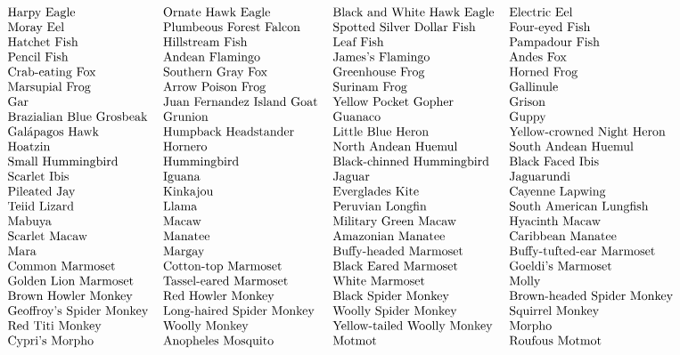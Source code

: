 \[\begin{tabular}{llll}
Harpy Eagle   & Ornate Hawk Eagle  & Black and White Hawk Eagle   & Electric Eel  \\
Moray Eel  & Plumbeous Forest Falcon   & Spotted Silver Dollar Fish   & Four-eyed Fish \\
Hatchet Fish   & Hillstream Fish   & Leaf Fish  & Pampadour Fish  \\
Pencil Fish   & Andean Flamingo  & James's Flamingo   & Andes Fox  \\
Crab-eating Fox  & Southern Gray Fox   & Greenhouse Frog   & Horned Frog \\
Marsupial Frog   & Arrow Poison Frog   & Surinam Frog  & Gallinule  \\
Gar   & Juan Fernandez Island Goat  & Yellow Pocket Gopher   & Grison  \\
Brazialian Blue Grosbeak  & Grunion   & Guanaco   & Guppy \\
Gal\'{a}pagos Hawk   & Humpback Headstander   & Little Blue Heron  & Yellow-crowned Night Heron  \\
Hoatzin   & Hornero  & North Andean Huemul   & South Andean Huemul  \\
Small Hummingbird  & Hummingbird   & Black-chinned Hummingbird   & Black Faced Ibis \\
Scarlet Ibis   & Iguana   & Jaguar  & Jaguarundi  \\
Pileated Jay   & Kinkajou  & Everglades Kite   & Cayenne Lapwing  \\
Teiid Lizard  & Llama   & Peruvian Longfin   & South American Lungfish \\
Mabuya   & Macaw   & Military Green Macaw  & Hyacinth Macaw  \\
Scarlet Macaw   & Manatee  & Amazonian Manatee   & Caribbean Manatee  \\
Mara  & Margay   & Buffy-headed Marmoset   & Buffy-tufted-ear Marmoset \\
Common Marmoset   & Cotton-top Marmoset   & Black Eared Marmoset  & Goeldi's Marmoset  \\
Golden Lion Marmoset   & Tassel-eared Marmoset  & White Marmoset   & Molly  \\
Brown Howler Monkey  & Red Howler Monkey   & Black Spider Monkey   & Brown-headed Spider Monkey \\
Geoffroy's Spider Monkey   & Long-haired Spider Monkey   & Woolly Spider Monkey  & Squirrel Monkey  \\
Red Titi Monkey   & Woolly Monkey  & Yellow-tailed Woolly Monkey   & Morpho  \\
Cypri's Morpho  & Anopheles Mosquito   & Motmot   & Roufous Motmot \\

\end{tabular}\]
